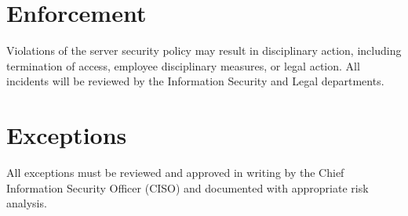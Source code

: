 \section{Enforcement}
Violations of the server security policy may result in disciplinary action, including termination of access, employee disciplinary measures, or legal action. All incidents will be reviewed by the Information Security and Legal departments.

\section{Exceptions}
All exceptions must be reviewed and approved in writing by the Chief Information Security Officer (CISO) and documented with appropriate risk analysis.